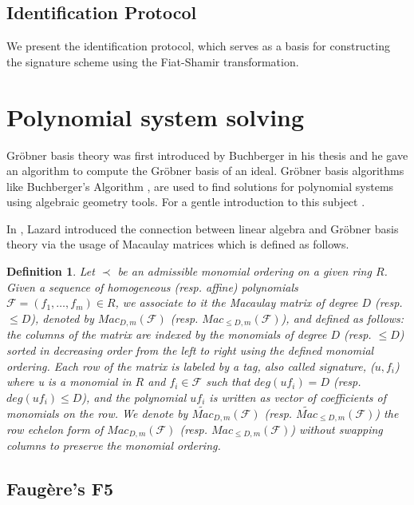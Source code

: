 \documentclass[english]{article}
\newtheorem{definition}{Definition}[section]
\newcommand{\Mac}[3]{{Mac_{#1, #2}(\mathcal{#3})}}
\newcommand{\Mact}[3]{{\widetilde{Mac}_{#1, #2}(\mathcal{#3})}}
\begin{document}
		\subsection{Identification Protocol}
		We present the identification protocol, which serves as a basis for constructing the signature scheme using the Fiat-Shamir transformation.
		
		
		
	\section{Polynomial system solving}\label{sec3}
		Gröbner basis theory was first introduced by Buchberger in his thesis \cite{Buc} and he gave an algorithm to compute the Gröbner basis of an ideal.
		Gröbner basis algorithms like Buchberger's Algorithm \cite{Buc}, are used to find solutions for polynomial systems using algebraic geometry tools. For a gentle introduction to this subject \cite{CLS}.
		
		In \cite{Lazard83}, Lazard introduced the connection between linear algebra and Gröbner basis theory via the usage of Macaulay matrices \cite{Mac} which is defined as follows.
		
		\begin{definition}
			Let $\prec$ be an admissible monomial ordering on a given ring $R$. Given a sequence of homogeneous (resp. affine) polynomials $\mathcal{F} = (f_1,\dots,f_m) \in R$, we associate to it the Macaulay matrix of degree $D$ (resp. $\leq D$), denoted by $\Mac{D}{m}{\mathcal{F}}$ (resp. $\Mac{\leq D}{m}{\mathcal{F}}$), and defined as follows: the columns of the matrix are indexed by the monomials of degree $D$ (resp. $\leq D$) sorted in decreasing order from the left to right using the defined monomial ordering. Each row of the matrix is labeled by a tag, also called signature, ($u, f_i$) where u is a monomial in $R$ and $f_i \in \mathcal{F}$ such that $deg(uf_i) = D$ (resp. $deg(uf_i) \leq D$), and the polynomial $uf_i$ is written as vector of coefficients of monomials on the row. We denote by $\Mact{D}{m}{F}$ (resp. $\Mact{\leq D}{m}{F}$) the row echelon form of $\Mac{D}{m}{\mathcal{F}}$ (resp. $\Mac{\leq D}{m}{\mathcal{F}}$) without swapping columns to preserve the monomial ordering.
		\end{definition}
		
		\subsection{Faugère's F5}
		
\end{document}
